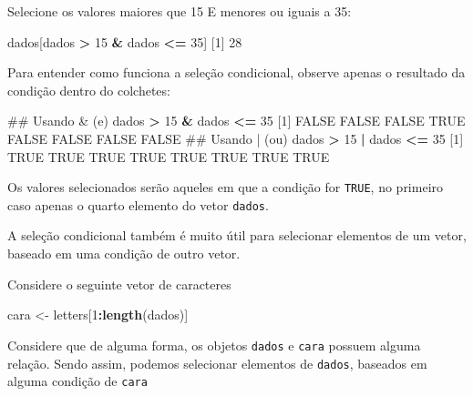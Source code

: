 \documentclass[10pt,a4paper]{book}
\newenvironment{Shaded}{\begin{snugshade}}{\end{snugshade}}
\newcommand{\KeywordTok}[1]{\textcolor[rgb]{0.13,0.29,0.53}{\textbf{#1}}}
\newcommand{\DecValTok}[1]{\textcolor[rgb]{0.00,0.00,0.81}{#1}}
\newcommand{\StringTok}[1]{\textcolor[rgb]{0.31,0.60,0.02}{#1}}
\newcommand{\OtherTok}[1]{\textcolor[rgb]{0.56,0.35,0.01}{#1}}
\newcommand{\OperatorTok}[1]{\textcolor[rgb]{0.81,0.36,0.00}{\textbf{#1}}}
\newcommand{\NormalTok}[1]{#1}
\begin{document}
Selecione os valores maiores que 15 E menores ou iguais a 35:

\begin{Shaded}
\begin{Highlighting}[]
\NormalTok{dados[dados }\OperatorTok{>}\StringTok{ }\DecValTok{15} \OperatorTok{&}\StringTok{ }\NormalTok{dados }\OperatorTok{<=}\StringTok{ }\DecValTok{35}\NormalTok{]}
\NormalTok{[}\DecValTok{1}\NormalTok{] }\DecValTok{28}
\end{Highlighting}
\end{Shaded}

Para entender como funciona a seleção condicional, observe apenas o
resultado da condição dentro do colchetes:

\begin{Shaded}
\begin{Highlighting}[]
\NormalTok{## Usando & (e)}
\NormalTok{dados }\OperatorTok{>}\StringTok{ }\DecValTok{15} \OperatorTok{&}\StringTok{ }\NormalTok{dados }\OperatorTok{<=}\StringTok{ }\DecValTok{35}
\NormalTok{[}\DecValTok{1}\NormalTok{] }\OtherTok{FALSE} \OtherTok{FALSE} \OtherTok{FALSE}  \OtherTok{TRUE} \OtherTok{FALSE} \OtherTok{FALSE} \OtherTok{FALSE} \OtherTok{FALSE}
\NormalTok{## Usando | (ou)}
\NormalTok{dados }\OperatorTok{>}\StringTok{ }\DecValTok{15} \OperatorTok{|}\StringTok{ }\NormalTok{dados }\OperatorTok{<=}\StringTok{ }\DecValTok{35}
\NormalTok{[}\DecValTok{1}\NormalTok{] }\OtherTok{TRUE} \OtherTok{TRUE} \OtherTok{TRUE} \OtherTok{TRUE} \OtherTok{TRUE} \OtherTok{TRUE} \OtherTok{TRUE} \OtherTok{TRUE}
\end{Highlighting}
\end{Shaded}

Os valores selecionados serão aqueles em que a condição for
\texttt{TRUE}, no primeiro caso apenas o quarto elemento do vetor
\texttt{dados}.

A seleção condicional também é muito útil para selecionar elementos de
um vetor, baseado em uma condição de outro vetor.

Considere o seguinte vetor de caracteres

\begin{Shaded}
\begin{Highlighting}[]
\NormalTok{cara <-}\StringTok{ }\NormalTok{letters[}\DecValTok{1}\OperatorTok{:}\KeywordTok{length}\NormalTok{(dados)]}
\end{Highlighting}
\end{Shaded}

Considere que de alguma forma, os objetos \texttt{dados} e \texttt{cara}
possuem alguma relação. Sendo assim, podemos selecionar elementos de
\texttt{dados}, baseados em alguma condição de \texttt{cara}
\end{document}
